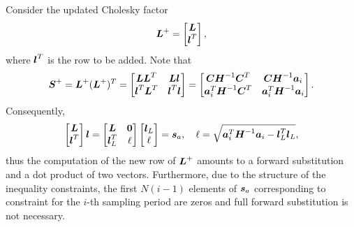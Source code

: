 Consider the updated Cholesky factor
$$
\mbox{\boldmath $L$}^+ =  \begin{bmatrix} \mbox{\boldmath $L$} \\ \mbox{\boldmath $l$}^T \end{bmatrix} ,
$$
where $\mbox{\boldmath $l$}^T$ is the row to be added. Note that
$$
\mbox{\boldmath $S$}^+ = \mbox{\boldmath $L$}^+(\mbox{\boldmath $L$}^+)^T = 
\begin{bmatrix}
    \mbox{\boldmath $L$}\mbox{\boldmath $L$}^T      & \mbox{\boldmath $L$}\mbox{\boldmath $l$}\\
    \mbox{\boldmath $l$}^T\mbox{\boldmath $L$}^T    & \mbox{\boldmath $l$}^T\mbox{\boldmath $l$}
\end{bmatrix}
 =
\begin{bmatrix}
    \mbox{\boldmath $C$} \mbox{\boldmath $H$}^{-1} \mbox{\boldmath $C$}^T      & \mbox{\boldmath $C$} \mbox{\boldmath $H$}^{-1} \mbox{\boldmath $a$}_i\\
    \mbox{\boldmath $a$}^T_i \mbox{\boldmath $H$}^{-1} \mbox{\boldmath $C$}^T    & \mbox{\boldmath $a$}^T_i \mbox{\boldmath $H$}^{-1} \mbox{\boldmath $a$}_i\\
\end{bmatrix}.
$$
Consequently, 
$$
\begin{bmatrix}
    \mbox{\boldmath $L$}\\
    \mbox{\boldmath $l$}^T
\end{bmatrix}
 \mbox{\boldmath $l$} 
= 
\begin{bmatrix}
    \mbox{\boldmath $L$}     & \mbox{\boldmath $0$}\\
    \mbox{\boldmath $l$}^T_L   & \ell
\end{bmatrix}
\begin{bmatrix}
    \mbox{\boldmath $l$}_L\\
    \ell
\end{bmatrix}
= \mbox{\boldmath $s$}_a, \quad
\ell = \sqrt{\mbox{\boldmath $a$}^T_i \mbox{\boldmath $H$}^{-1} \mbox{\boldmath $a$}_i - \mbox{\boldmath $l$}^T_L\mbox{\boldmath $l$}_L},
$$
thus the computation of the new row of $\mbox{\boldmath $L$}^+$ amounts to a forward substitution
and a dot product of two vectors. Furthermore, due to the structure of the inequality
constraints, the first $N(i-1)$ elements of $\mbox{\boldmath $s$}_a$ corresponding to constraint
for the $i$-th sampling period are zeros and full forward substitution is not
necessary.



